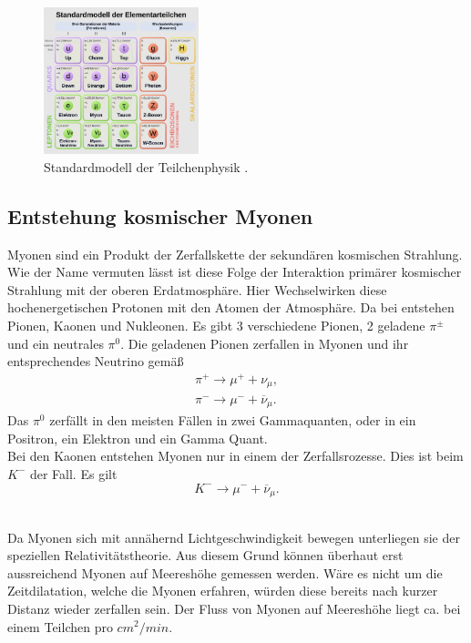 \begin{figure}[h]
    \centering
    \includegraphics[width=0.4\textwidth]{images:/standartmodell.png}
    \caption{ Standardmodell der Teilchenphysik   \cite{standardmodell}.}
    \label{standartmodell}
\end{figure}




\subsection{Entstehung kosmischer Myonen} \label{myon_entstehung}
Myonen sind ein Produkt der Zerfallskette der sekundären kosmischen Strahlung. Wie der Name vermuten lässt ist diese Folge der Interaktion primärer kosmischer Strahlung mit der oberen Erdatmosphäre.
Hier Wechselwirken diese hochenergetischen Protonen mit den Atomen der Atmosphäre.
Da bei entstehen Pionen, Kaonen und Nukleonen. 
Es gibt 3 verschiedene Pionen, 2 geladene $\pi^{\pm}$ und ein neutrales $\pi^0$. 
Die geladenen Pionen zerfallen in Myonen und ihr entsprechendes Neutrino gemäß 
\begin{align}
    \pi^+ \rightarrow  \mu^+ + \nu_{\mu},\\
    \pi^- \rightarrow  \mu^- + \overline{\nu}_{\mu}.
\end{align} 
Das $\pi^0$ zerfällt in den meisten Fällen in zwei Gammaquanten, oder in ein Positron, ein Elektron und ein Gamma Quant.\\
Bei den Kaonen entstehen Myonen nur in einem der Zerfallsrozesse.
Dies ist beim $K^-$ der Fall.
Es gilt 
\begin{equation}
    K^- \rightarrow \mu^- + \overline{\nu}_{\mu}.
\end{equation}
\\
\newline

Da Myonen sich mit annähernd Lichtgeschwindigkeit bewegen unterliegen sie der speziellen Relativitätstheorie. 
Aus diesem Grund können überhaut erst aussreichend Myonen auf Meereshöhe gemessen werden. 
Wäre es nicht um die Zeitdilatation, welche die Myonen erfahren, würden diese bereits nach kurzer Distanz wieder zerfallen sein. %
Der Fluss von Myonen auf Meereshöhe liegt ca. bei einem Teilchen pro $cm^2/min$. %


